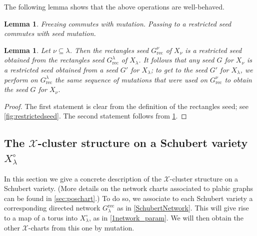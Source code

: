 \documentclass{amsart}
\newtheorem{lemma}[thm]{Lemma}
\theoremstyle{definition}
\numberwithin{equation}{section}
\newcommand{\rect}{\mathrm{rec}}
\newcommand{\XX}{{\mathcal X}}
\newcommand{\openSchub}{{X_{\lambda}^{\circ}}}
\begin{document}
The following lemma shows that the above operations are well-behaved.
\begin{lemma}\cite[Lemma 4.2.2 and Lemma 4.2.5]{FWZ2} \label{l:freezingcommutesmutation}
Freezing commutes with mutation.  
Passing to a restricted seed commutes with seed mutation.
\end{lemma}

\begin{lemma}\label{lem:restrictedseed}
Let $\nu\subseteq \lambda$.
Then the rectangles seed $G^\nu_\rect$ of $X_\nu$ is a restricted seed obtained 
from the rectangles seed $G^{\lambda}_{\rect}$ of $X_\lambda$.
It follows that any seed $G$ for $X_\nu$ is a restricted seed  obtained from a seed
$G'$ for $X_\lambda$; to get to the seed $G'$ for $X_{\lambda}$, we perform
on $G^\lambda_\rect$ the same sequence of mutations that were used on $G^\nu_\rect$ to obtain the seed $G$ for $X_{\nu}$.  
\end{lemma}
\begin{proof}
The first statement is clear from the definition of the rectangles seed; see \cref{fig:restrictedseed}.
The second statement follows from \cref{l:freezingcommutesmutation}.
\end{proof}








\subsection{The $\XX$-cluster structure on a Schubert variety $\openSchub$}\label{sec:Xcluster}




In this section we give a concrete description of the
$\XX$-cluster structure on a Schubert variety.
(More details on the network charts associated to plabic graphs can be found in
\cref{sec:poschart}.)
To do so, 
we associate to each Schubert variety a corresponding directed network 
$G_{\lambda}^{\rect}$ as in 
\cref{SchubertNetwork}.
This will give rise to a map of a torus into $\openSchub$, as in 
\cref{1network_param}.
We will then obtain the other $\XX$-charts
from this one by mutation.
\end{document}
